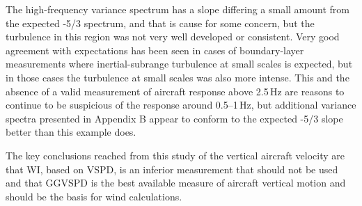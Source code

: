 \documentclass[12pt,twoside,english]{article}\usepackage[]{graphicx}\usepackage[]{color}
\begin{document}
The high-frequency variance spectrum has a slope differing a small amount from the expected -5/3 spectrum, and that is cause for some concern, but the turbulence in this region was not very well developed or consistent. Very good agreement with expectations has been seen in cases of boundary-layer measurements where inertial-subrange turbulence at small scales is expected, but in those cases the turbulence at small scales was also more intense. This and the absence of a valid measurement of aircraft response above 2.5\,Hz are reasons to continue to be suspicious of the response around 0.5--1\,Hz, but additional variance spectra presented in Appendix B appear to conform to the expected -5/3 slope  better than this example does. %

The key conclusions reached from this study of the vertical aircraft velocity are that WI, based on VSPD, is an inferior measurement that should not be used and that GGVSPD is the best available measure of aircraft vertical motion and should be the basis for wind calculations.
\end{document}

